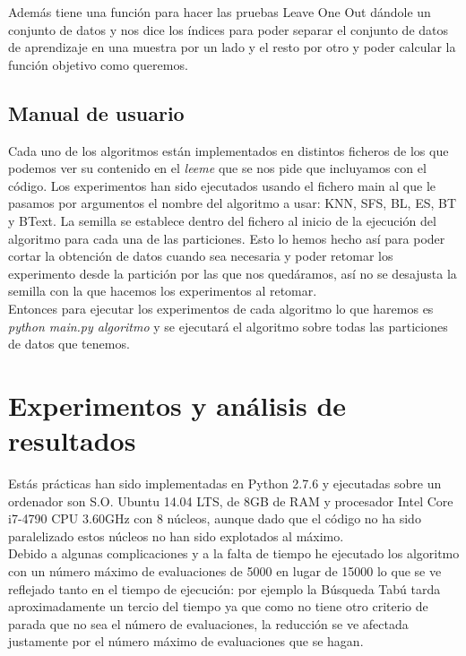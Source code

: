 \documentclass[10pt,a4paper]{article}
\begin{document}
Además tiene una función para hacer las pruebas Leave One Out dándole un conjunto de datos y nos dice los índices para poder separar el conjunto de datos de aprendizaje en una muestra por un lado y el resto por otro y poder calcular la función objetivo como queremos.\\

\subsection{\color[rgb]{0.0,0.0,0.51}Manual de usuario}

Cada uno de los algoritmos están implementados en distintos ficheros de los que podemos ver su contenido en el \textit{leeme} que se nos pide que incluyamos con el código. Los experimentos han sido ejecutados usando el fichero main al que le pasamos por argumentos el nombre del algoritmo a usar: KNN, SFS, BL, ES, BT y BText. La semilla se establece dentro del fichero al inicio de la ejecución del algoritmo para cada una de las particiones. Esto lo hemos hecho así para poder cortar la obtención de datos cuando sea necesaria y poder retomar los experimento desde la partición por las que nos quedáramos, así no se desajusta la semilla con la que hacemos los experimentos al retomar.\\

Entonces para ejecutar los experimentos de cada algoritmo lo que haremos es \textit{python main.py algoritmo} y se ejecutará el algoritmo sobre todas las particiones de datos que tenemos.\\

\section{\color[rgb]{0.0,0.0,0.21}Experimentos y análisis de resultados}

Estás prácticas han sido implementadas en Python 2.7.6 y ejecutadas sobre un ordenador son S.O. Ubuntu 14.04 LTS, de 8GB de RAM y procesador Intel Core i7-4790 CPU 3.60GHz con 8 núcleos, aunque dado que el código no ha sido paralelizado estos núcleos no han sido explotados al máximo.\\

Debido a algunas complicaciones y a la falta de tiempo he ejecutado los algoritmo con un número máximo de evaluaciones de 5000 en lugar de 15000 lo que se ve reflejado tanto en el tiempo de ejecución: por ejemplo la Búsqueda Tabú tarda aproximadamente un tercio del tiempo ya que como no tiene otro criterio de parada que no sea el número de evaluaciones, la reducción se ve afectada justamente por el número máximo de evaluaciones que se hagan.\\
\end{document}
